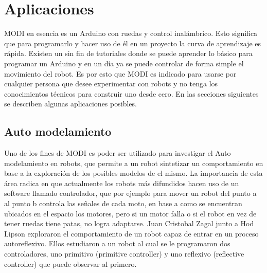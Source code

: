 
\chapter{Aplicaciones} %

\label{ChapterX} %


MODI en esencia es un Arduino con ruedas y control inalámbrico. Esto significa que para programarlo y hacer uso de él en un proyecto la curva de aprendizaje es rápida. Existen un sin fin de tutoriales donde se puede aprender lo básico para programar un Arduino y en un día ya se puede controlar de forma simple el movimiento del robot. Es por esto que MODI es indicado para usarse por cualquier persona que desee experimentar con robots y no tenga los conocimientos técnicos para construir uno desde cero. En las secciones siguientes se describen algunas aplicaciones posibles.

\section{Auto modelamiento}

Uno de los fines de MODI es poder ser utilizado para investigar el Auto modelamiento en robots, que permite a un robot sintetizar un comportamiento en base a la exploración de los posibles modelos de el mismo. La importancia de esta área radica en que actualmente los robots más difundidos hacen uso de un software llamado controlador, que por ejemplo para mover un robot del punto a al punto b controla las señales de cada moto, en base a como se encuentran ubicados en el espacio los motores, pero si un motor falla o si el robot en vez de tener ruedas tiene patas, no logra adaptarse. Juan Cristobal Zagal junto a Hod Lipson \cite{ZagalL09} exploraron el comportamiento de un robot capaz de entrar en un proceso autoreflexivo. Ellos estudiaron a un robot al cual se le programaron dos controladores, uno primitivo (primitive controller) y uno reflexivo (reflective controller) que puede observar al primero.

